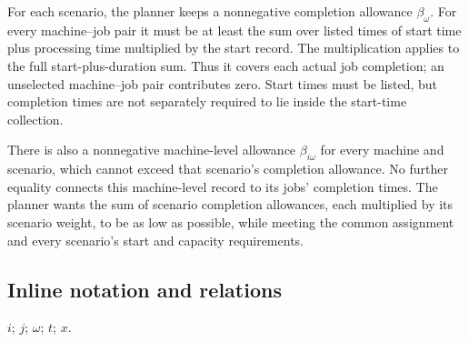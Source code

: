 \documentclass[10pt]{article}
\begin{document}
For each scenario, the planner keeps a nonnegative completion allowance $\beta_\omega$. For every machine--job pair it must be at least the sum over listed times of start time plus processing time multiplied by the start record. The multiplication applies to the full start-plus-duration sum. Thus it covers each actual job completion; an unselected machine--job pair contributes zero. Start times must be listed, but completion times are not separately required to lie inside the start-time collection.

There is also a nonnegative machine-level allowance $\beta_{i\omega}$ for every machine and scenario, which cannot exceed that scenario's completion allowance. No further equality connects this machine-level record to its jobs' completion times. The planner wants the sum of scenario completion allowances, each multiplied by its scenario weight, to be as low as possible, while meeting the common assignment and every scenario's start and capacity requirements.

\subsection*{Inline notation and relations}
$i$; $j$; $\omega$; $t$; $x$.
\end{document}

